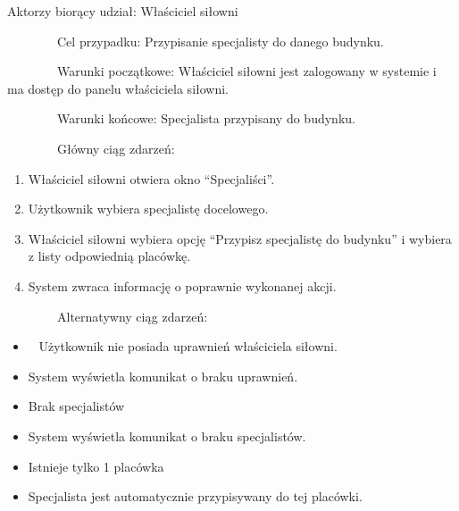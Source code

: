 {Aktorzy biorący udział: Właściciel siłowni}

{~~~~~~~~Cel przypadku: Przypisanie specjalisty do danego budynku.}

{~~~~~~~~Warunki początkowe: Właściciel siłowni jest zalogowany w
systemie i ma dostęp do panelu właściciela siłowni.}

{~~~~~~~~Warunki końcowe: Specjalista przypisany do budynku.}

{~~~~~~~~Główny ciąg zdarzeń:}

\begin{enumerate}
\tightlist
\item
  {Właściciel siłowni otwiera okno ``Specjaliści''.}
\item
  {Użytkownik wybiera specjalistę docelowego.}
\item
  {Właściciel siłowni wybiera opcję ``Przypisz specjalistę do budynku''
  i wybiera z listy odpowiednią placówkę.}
\item
  {System zwraca informację o poprawnie wykonanej akcji.}
\end{enumerate}

{~~~~~~~~Alternatywny ciąg zdarzeń:}

\begin{itemize}
\tightlist
\item
  {~ Użytkownik nie posiada uprawnień właściciela siłowni.}
\end{itemize}

\begin{itemize}
\tightlist
\item
  {System wyświetla komunikat o braku uprawnień.}
\end{itemize}

\begin{itemize}
\tightlist
\item
  {Brak specjalistów}
\end{itemize}

\begin{itemize}
\tightlist
\item
  {System wyświetla komunikat o braku specjalistów.}
\end{itemize}

{}

{}

\begin{itemize}
\tightlist
\item
  {Istnieje tylko 1 placówka }
\end{itemize}

\begin{itemize}
\tightlist
\item
  {Specjalista jest automatycznie przypisywany do tej placówki.\\
  }
\end{itemize}

